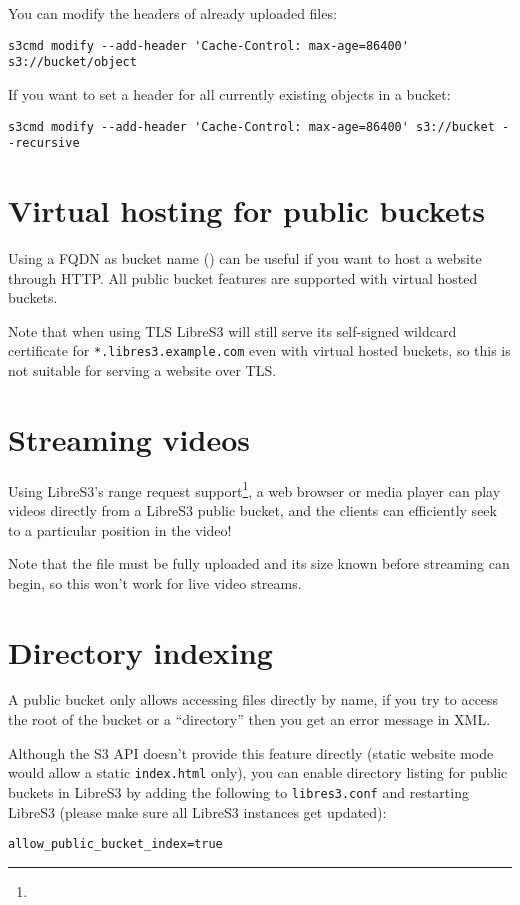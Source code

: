 You can modify the headers of already uploaded files:
\begin{lstlisting}
s3cmd modify --add-header 'Cache-Control: max-age=86400' s3://bucket/object
\end{lstlisting}

If you want to set a header for all currently existing objects in a bucket:
\begin{lstlisting}
s3cmd modify --add-header 'Cache-Control: max-age=86400' s3://bucket --recursive
\end{lstlisting}

\section{Virtual hosting for public buckets}
\label{sec:pubvirtualhosting}

Using a FQDN as bucket name () can be useful if you
want to host a website through HTTP\@. All public bucket features are supported with virtual hosted buckets.

Note that when using TLS LibreS3 will still serve its self-signed wildcard certificate for \verb|*.libres3.example.com| even with virtual hosted buckets, so this is not suitable for serving a website over TLS\@.

\section{Streaming videos}
\label{sec:streaming-videos}

Using LibreS3's range request support\footnote{}, a web browser
or media player can play videos directly from a LibreS3 public bucket, and the
clients can efficiently seek to a particular position in the video!

Note that the file must be fully uploaded and its size known before streaming
can begin, so this won't work for live video streams.

\section{Directory indexing}
\label{sec:directory-indexing}
A public bucket only allows accessing files directly by name, if you try to
access the root of the bucket or a ``directory'' then you get an error message
in XML\@.

Although the S3 API doesn't provide this feature directly (static website mode
would allow a static \verb|index.html| only), you can enable directory listing
for public buckets in LibreS3 by adding the following to \verb|libres3.conf| and
restarting LibreS3 (please make sure all LibreS3 instances get updated):
\begin{lstlisting}
allow_public_bucket_index=true
\end{lstlisting}

